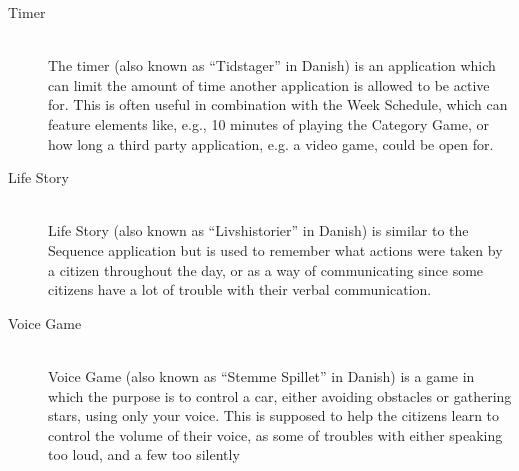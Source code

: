 \begin{description}
	\item[Timer] \hfill \\
	The timer (also known as ``Tidstager'' in Danish) is an application which can limit the amount of time another application is allowed to be active for.
	This is often useful in combination with the Week Schedule, which can feature elements like, e.g., 10 minutes of playing the Category Game, or how long a third party application, e.g. a video game, could be open for.
	\item[Life Story] \hfill \\
	Life Story (also known as ``Livshistorier'' in Danish) is similar to the Sequence application but is used to remember what actions were taken by a citizen throughout the day, or as a way of communicating since some citizens have a lot of trouble with their verbal communication.
	\item[Voice Game] \hfill \\
	Voice Game (also known as ``Stemme Spillet'' in Danish) is a game in which the purpose is to control a car, either avoiding obstacles or gathering stars, using only your voice.
	This is supposed to help the citizens learn to control the volume of their voice, as some of troubles with either speaking too loud, and a few too silently
\end{description}
